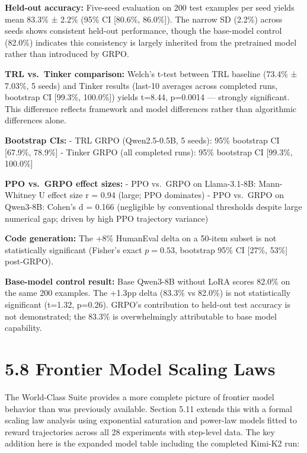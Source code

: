 \documentclass[
  american,
  11pt,
  a4paper,
  oneside]{report}
\begin{document}
\textbf{Held-out accuracy:} Five-seed evaluation on 200 test examples
per seed yields mean 83.3\% ± 2.2\% (95\% CI {[}80.6\%, 86.0\%{]}). The
narrow SD (2.2\%) across seeds shows consistent held-out performance,
though the base-model control (82.0\%) indicates this consistency is
largely inherited from the pretrained model rather than introduced by
GRPO.

\textbf{TRL vs.~Tinker comparison:} Welch's t-test between TRL baseline
(73.4\% ± 7.03\%, 5 seeds) and Tinker results (last-10 averages across
completed runs, bootstrap CI {[}99.3\%, 100.0\%{]}) yields t=8.44,
p=0.0014 --- strongly significant. This difference reflects framework
and model differences rather than algorithmic differences alone.

\textbf{Bootstrap CIs:} - TRL GRPO (Qwen2.5-0.5B, 5 seeds): 95\%
bootstrap CI {[}67.9\%, 78.9\%{]} - Tinker GRPO (all completed runs):
95\% bootstrap CI {[}99.3\%, 100.0\%{]}

\textbf{PPO vs.~GRPO effect sizes:} - PPO vs.~GRPO on Llama-3.1-8B:
Mann-Whitney U effect size r = 0.94 (large; PPO dominates) - PPO
vs.~GRPO on Qwen3-8B: Cohen's d = 0.166 (negligible by conventional
thresholds despite large numerical gap; driven by high PPO trajectory
variance)

\textbf{Code generation:} The +8\% HumanEval delta on a 50-item subset
is not statistically significant (Fisher's exact \(p{=}0.53\), bootstrap
95\% CI {[}27\%, 53\%{]} post-GRPO).

\textbf{Base-model control result:} Base Qwen3-8B without LoRA scores
82.0\% on the same 200 examples. The +1.3pp delta (83.3\% vs 82.0\%) is
not statistically significant (t=1.32, p=0.26). GRPO's contribution to
held-out test accuracy is not demonstrated; the 83.3\% is overwhelmingly
attributable to base model capability.

\section{5.8 Frontier Model Scaling
Laws}\label{frontier-model-scaling-laws}

The World-Class Suite provides a more complete picture of frontier model
behavior than was previously available. Section 5.11 extends this with a
formal scaling law analysis using exponential saturation and power-law
models fitted to reward trajectories across all 28 experiments with
step-level data. The key addition here is the expanded model table
including the completed Kimi-K2 run:
\end{document}
